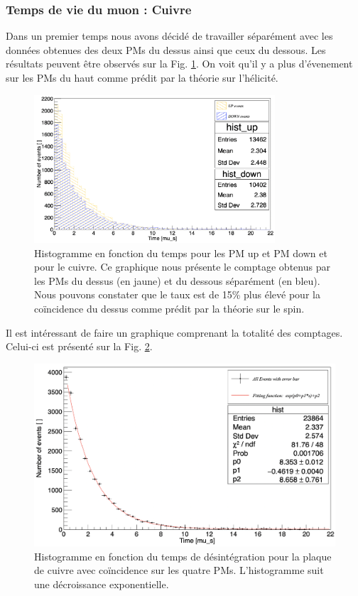 \documentclass[12pt]{article}
\begin{document}
\subsubsection{Temps de vie du muon : Cuivre}

Dans un premier temps nous avons décidé de travailler séparément avec les données obtenues des deux PMs du dessus ainsi que ceux du dessous. Les résultats peuvent être observés sur la Fig. \ref{fig:comptage_cuivre_up_down_separement}. On voit qu'il y a plus d'évenement sur les PMs du haut comme prédit par la théorie sur l'hélicité.

\begin{figure}[htpb!]
    \centering
    \includegraphics[width=0.8\textwidth]{graphiques/experience1/cuivre/comptage_cuivre_up_down_separement.png}
    \caption{Histogramme en fonction du temps pour les PM up et PM down et pour le cuivre. Ce graphique nous présente le comptage obtenus par les PMs du dessus (en jaune) et du dessous séparément (en bleu). Nous pouvons constater que le taux est de 15\% plus élevé pour la coïncidence du dessus comme prédit par la théorie sur le spin.}
    \label{fig:comptage_cuivre_up_down_separement}
\end{figure}

Il est intéressant de faire un graphique comprenant la totalité des comptages. Celui-ci est présenté sur la Fig. \ref{fig:comptage_total_cuivre}.

\begin{figure}[htpb!]
    \centering
    \includegraphics[width=\textwidth]{graphiques/experience1/cuivre/comptage_total_cuivre.png}
    \caption{Histogramme en fonction du temps de désintégration pour la plaque de cuivre avec coïncidence sur les quatre PMs. L'histogramme suit une décroissance exponentielle.}
    \label{fig:comptage_total_cuivre}
\end{figure}
\end{document}
